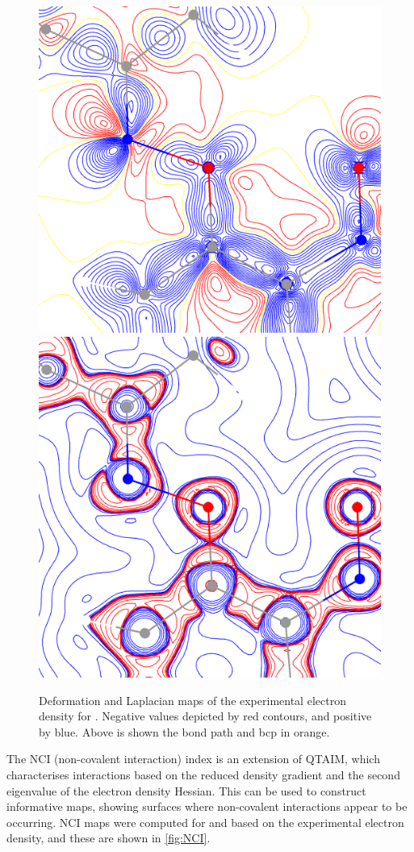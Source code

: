 \begin{refsection}
\begin{figure}
	\includegraphics[width=0.45\columnwidth]{Figures/cyclohexanone-oxime-dnp-defdens.pdf}
	\includegraphics[width=0.45\columnwidth]{Figures/cyclohexanone-oxime-dnp-lapl.pdf}
	\caption[Deformation and Laplacian maps of the electron density for .]{Deformation and Laplacian maps of the experimental electron density for . Negative values depicted by red contours, and positive by blue. Above is shown the bond path and bcp in orange.}
	\label{fig:lapl}
\end{figure}

The NCI (non-covalent interaction) index is an extension of QTAIM, which characterises interactions based on the reduced density gradient and the second eigenvalue of the electron density Hessian.\autocite{Johnson2010a}
This can be used to construct informative maps, showing surfaces where non-covalent interactions appear to be occurring.
NCI maps were computed for  and  based on the experimental electron density, and these are shown in \cref{fig:NCI}.


\end{refsection}
